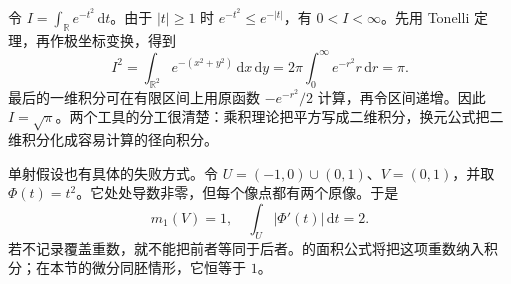 \ProseParagraphBreak

令 \(I=\int_{\mathbb R}e^{-t^2}\,\mathrm{d}t\)。由于 \(|t|\geq1\) 时 \(e^{-t^2}\leq e^{-|t|}\)，有 \(0<I<\infty\)。先用 Tonelli 定理，再作极坐标变换，得到
\[
I^2=\int_{\mathbb R^2}e^{-(x^2+y^2)}\,\mathrm{d}x\,\mathrm{d}y
=2\pi\int_0^\infty e^{-r^2}r\,\mathrm{d}r=\pi.
\]
最后的一维积分可在有限区间上用原函数 \(-e^{-r^2}/2\) 计算，再令区间递增。因此 \(I=\sqrt\pi\)。两个工具的分工很清楚：乘积理论把平方写成二维积分，换元公式把二维积分化成容易计算的径向积分。

\ProseParagraphBreak

单射假设也有具体的失败方式。令
\(U=(-1,0)\cup(0,1)\)、\(V=(0,1)\)，并取 \(\Phi(t)=t^2\)。它处处导数非零，但每个像点都有两个原像。于是
\[
m_1(V)=1,\quad \int_U|\Phi'(t)|\,\mathrm{d}t=2.
\]
若不记录覆盖重数，就不能把前者等同于后者。的面积公式将把这项重数纳入积分；在本节的微分同胚情形，它恒等于 \(1\)。
